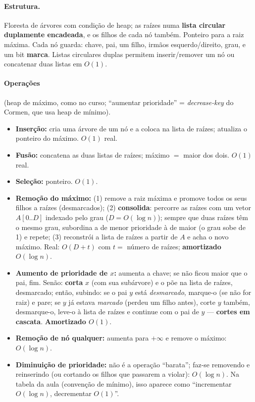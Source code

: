 \paragraph{Estrutura.} Floresta de árvores com condição de heap; as raízes numa \textbf{lista circular duplamente encadeada}, e os filhos de cada nó também. Ponteiro para a raiz máxima. Cada nó guarda: chave, pai, um filho, irmãos esquerdo/direito, grau, e um bit \textbf{marca}. Listas circulares duplas permitem inserir/remover um nó ou concatenar duas listas em $O(1)$.

\paragraph{Operações} (heap de máximo, como no curso; ``aumentar prioridade'' = \emph{decrease-key} do Cormen, que usa heap de mínimo).
\begin{itemize}
  \item \textbf{Inserção:} cria uma árvore de um nó e a coloca na lista de raízes; atualiza o ponteiro do máximo. $O(1)$ real.
  \item \textbf{Fusão:} concatena as duas listas de raízes; máximo $=$ maior dos dois. $O(1)$ real.
  \item \textbf{Seleção:} ponteiro. $O(1)$.
  \item \textbf{Remoção do máximo:} (1) remove a raiz máxima e promove todos os seus filhos a raízes (desmarcados); (2) \textbf{consolida}: percorre as raízes com um vetor $A[0..D]$ indexado pelo grau ($D=O(\log n)$); sempre que duas raízes têm o mesmo grau, subordina a de menor prioridade à de maior (o grau sobe de 1) e repete; (3) reconstrói a lista de raízes a partir de $A$ e acha o novo máximo. Real: $O(D+t)$ com $t=$ número de raízes; \textbf{amortizado $O(\log n)$}.
  \item \textbf{Aumento de prioridade de $x$:} aumenta a chave; se não ficou maior que o pai, fim. Senão: \textbf{corta} $x$ (com sua subárvore) e o põe na lista de raízes, desmarcado; então, subindo: se o pai $y$ está \emph{desmarcado}, marque-o (se não for raiz) e pare; se $y$ já estava \emph{marcado} (perdeu um filho antes), corte $y$ também, desmarque-o, leve-o à lista de raízes e continue com o pai de $y$ --- \textbf{cortes em cascata}. \textbf{Amortizado $O(1)$}.
  \item \textbf{Remoção de nó qualquer:} aumenta para $+\infty$ e remove o máximo: $O(\log n)$\am.
  \item \textbf{Diminuição de prioridade:} não é a operação ``barata''; faz-se removendo e reinserindo (ou cortando os filhos que passarem a violar): $O(\log n)$\am. Na tabela da aula (convenção de mínimo), isso aparece como ``incrementar $O(\log n)$\am, decrementar $O(1)$\am''.
\end{itemize}

